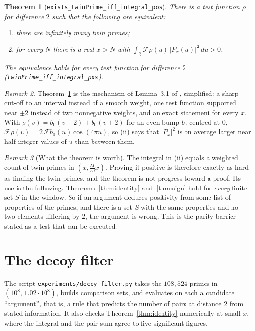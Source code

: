 \documentclass[11pt]{article}
\newtheorem{theorem}{Theorem}
\theoremstyle{definition}
\theoremstyle{remark}
\newtheorem{remark}[theorem]{Remark}
\newcommand{\R}{\mathbb{R}}
\newcommand{\F}{\mathcal{F}}
\newcommand{\lean}[1]{\texttt{#1}}
\begin{document}
\begin{theorem}[\lean{exists\_twinPrime\_iff\_integral\_pos}]\label{thm:main}
There is a test function $\rho$ for difference $2$ such that the following are
equivalent:
\begin{enumerate}
\item[(i)] there are infinitely many twin primes;
\item[(ii)] for every $N$ there is a real $x>N$ with
$\displaystyle\int_\R \F\rho(u)\,|P_x(u)|^2\,du>0$.
\end{enumerate}
The equivalence holds for every test function for difference $2$
(\lean{twinPrime\_iff\_integral\_pos}).
\end{theorem}

\begin{remark}
Theorem~\ref{thm:main} is the mechanism of Lemma~3.1 of \cite{lee}, simplified:
a sharp cut-off to an interval instead of a smooth weight, one test function
supported near $\pm2$ instead of two nonnegative weights, and an exact statement
for every $x$. With $\rho(v)=b_0(v-2)+b_0(v+2)$ for an even bump $b_0$ centred at $0$,
$\F\rho(u)=2\,\F b_0(u)\cos(4\pi u)$, so (ii)
says that $|P_x|^2$ is on average larger near half-integer values of $u$ than
between them.
\end{remark}

\begin{remark}[What the theorem is worth]
The integral in (ii) equals a weighted count of twin primes in
$(x,\tfrac{51}{50}x)$. Proving it positive is therefore exactly as hard as
finding the twin primes, and the theorem is not progress toward a proof. Its
use is the following. Theorems~\ref{thm:identity} and~\ref{thm:sign} hold for
\emph{every} finite set $S$ in the window. So if an argument deduces positivity
from some list of properties of the primes, and there is a set $S$ with the same
properties and no two elements differing by $2$, the argument is wrong. This is
the parity barrier stated as a test that can be executed.
\end{remark}

\section{The decoy filter}\label{sec:decoy}

The script \lean{experiments/decoy\_filter.py} takes the $108{,}524$ primes in
$(10^8,\,1.02\cdot10^8)$, builds comparison sets, and evaluates on each a
candidate ``argument'', that is, a rule that predicts the number of pairs at
distance $2$ from stated information. It also checks Theorem~\ref{thm:identity}
numerically at small $x$, where the integral and the pair sum agree to five
significant figures.
\end{document}
